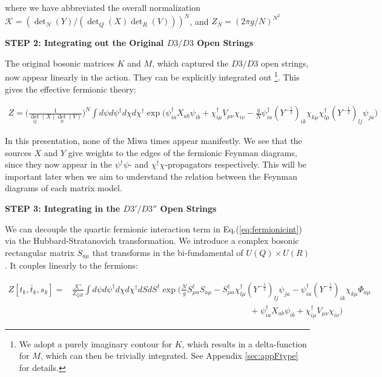\documentclass[english]{article}
\newcommand{\half}{\frac{1}{2}}
\renewcommand{\>}{\rangle}
\newcommand{\<}{\langle}
\renewcommand{\(}{\left(}
\renewcommand{\)}{\right)}
\begin{document}
where we have abbreviated the overall normalization $\mathcal{K}=(\det_{N}(Y)/ (\det_{Q}(X)\det_{R}(V)))^{N}$, and $Z_N = (2\pi g/N)^{N^2}$ 

\textbf{STEP 2: Integrating out the Original $D3/D3$ Open Strings}

The original bosonic matrices $K$ and $M$, which captured the $D3/D3$ open strings, now appear linearly in the action. They can be explicitly integrated out \footnote{We adopt a purely imaginary contour for $K$, which results in a delta-function for $M$, which can then be trivially integrated. See Appendix \ref{sec:appFtype} for details.}. This gives the effective fermionic theory:   

\begin{align}
    Z=\bigg(\frac{1}{\det_{Q}(X)\det_{R}(V)}\bigg)^{N} \int d\psi d\psi^{\dagger}d\chi d\chi^{\dagger}\exp\bigg(\psi^{\dagger}_{ia}X_{ab}\psi_{ib}+\chi^{\dagger}_{i\mu}V_{\mu\nu}\chi_{i\nu}-\frac{g}{N}\psi^{\dagger}_{ia}(Y^{-\half})_{ik}\chi_{k\mu}\chi_{l\mu}^{\dagger}(Y^{-\half})_{lj}\psi_{ja}\bigg) \label{eq:fermionicint}
\end{align}

In this presentation, none of the Miwa times appear manifestly. We see that the sources $X$ and $Y$ give weights to the edges of the fermionic Feynman diagrams, since they now appear in the $\psi^{\dagger} \psi $- and $\chi^{\dagger} \chi$-propagators respectively. This will be important later when we aim to understand the relation between the Feynman diagrams of each matrix model. 



\textbf{STEP 3: Integrating in the $D3'/D3''$ Open Strings}

We can decouple the quartic fermionic interaction term in Eq.(\ref{eq:fermionicint}) via the Hubbard-Stratanovich transformation. We introduce a complex bosonic rectangular matrix $S_{a \mu}$ that transforms in the bi-fundamental of $U(Q) \times U(R)$. It couples linearly to the fermions:


\begin{align} \label{eq:SSdagin}
 Z[t_{k},\bar{t}_{k},s_{k}] =&\frac{\mathcal{K}'}{Z_{QR}}\int d\psi d\psi^{\dagger}d\chi d\chi^{\dagger}dS dS^{\dagger}\exp\bigg( \frac{N}{g}S^{\dagger}_{\mu a}S_{a\mu}-S^{\dagger}_{\mu a}\chi^{\dagger}_{l\mu}(Y^{-\half})_{lj}\psi_{ja} - \psi_{ia}^{\dagger}(Y^{-\half})_{ik}\chi_{k\mu}\Phi_{a\mu} \nonumber\\ &\qquad\qquad\qquad\qquad\qquad\qquad\qquad\qquad\qquad\qquad\quad+\psi^{\dagger}_{ia}X_{ab}\psi_{ib}+\chi^{\dagger}_{i\mu}V_{\mu\nu}\chi_{i\nu}\bigg)
\end{align}
\end{document}
